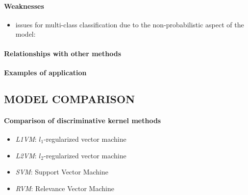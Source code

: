 \paragraph{Weaknesses}
\begin{itemize}
    \item issues for multi-class classification due to the non-probabilistic 
        aspect of the model: 
\end{itemize}

\paragraph{Relationships with other methods}
\paragraph{Examples of application}

\subsection{MODEL COMPARISON}
\paragraph{Comparison of discriminative kernel methods}
\begin{itemize}
    \item \emph{L1VM}: $l_{1}$-regularized vector machine
    \item \emph{L2VM}: $l_{2}$-regularized vector machine
    \item \emph{SVM}: Support Vector Machine
    \item \emph{RVM}: Relevance Vector Machine
\end{itemize}



